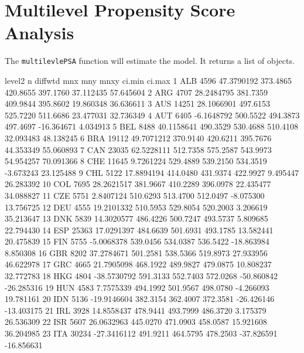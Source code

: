 \documentclass[nojss]{jss}
\begin{document}
\section{Multilevel Propensity Score Analysis}

The \texttt{multilevlePSA} function will estimate the model. It returns a list of objects.

\begin{Schunk}
\begin{Soutput}
   level2     n     diffwtd      mnx      mny     mnxy     ci.min     ci.max
1     ALB  4596  47.3790192 373.4865 420.8655 397.1760  37.112435  57.645604
2     ARG  4707  28.2484795 381.7359 409.9844 395.8602  19.860348  36.636611
3     AUS 14251  28.1066901 497.6153 525.7220 511.6686  23.477031  32.736349
4     AUT  6405  -6.1648792 500.5522 494.3873 497.4697 -16.364671   4.034913
5     BEL  8488  40.1158641 490.3529 530.4688 510.4108  32.093483  48.138245
6     BRA 19112  49.7071212 370.9140 420.6211 395.7676  44.353349  55.060893
7     CAN 23035  62.5228111 512.7358 575.2587 543.9973  54.954257  70.091366
8     CHE 11645   9.7261224 529.4889 539.2150 534.3519  -3.673243  23.125488
9     CHL  5122  17.8894194 414.0480 431.9374 422.9927   9.495447  26.283392
10    COL  7695  28.2621517 381.9667 410.2289 396.0978  22.435477  34.088827
11    CZE  5751   2.8407124 510.6293 513.4700 512.0497  -8.075300  13.756725
12    DEU  4555  19.2101332 510.5953 529.8054 520.2003   3.206619  35.213647
13    DNK  5839  14.3020577 486.4226 500.7247 493.5737   5.809685  22.794430
14    ESP 25363  17.0291397 484.6639 501.6931 493.1785  13.582441  20.475839
15    FIN  5755  -5.0068378 539.0456 534.0387 536.5422 -18.863984   8.850308
16    GBR  8202  37.2784671 501.2581 538.5366 519.8973  27.933956  46.622978
17    GRC  4665  21.7905098 468.1922 489.9827 479.0875  10.808237  32.772783
18    HKG  4804 -38.5730792 591.3133 552.7403 572.0268 -50.860842 -26.285316
19    HUN  4583   7.7575339 494.1992 501.9567 498.0780  -4.266093  19.781161
20    IDN  5136 -19.9146604 382.3154 362.4007 372.3581 -26.426146 -13.403175
21    IRL  3928  14.8558437 478.9441 493.7999 486.3720   3.175379  26.536309
22    ISR  5607  26.0632963 445.0270 471.0903 458.0587  15.921608  36.204985
23    ITA 30234 -27.3416112 491.9211 464.5795 478.2503 -37.826591 -16.856631

\end{Soutput}
\end{Schunk}
\end{document}
